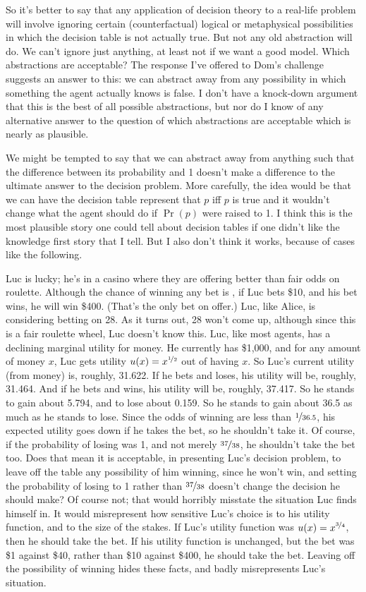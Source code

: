 \documentclass[11pt,oneside]{book}
\begin{document}
So it's better to say that any application of decision theory to a real-life problem will involve ignoring certain (counterfactual) logical or metaphysical possibilities in which the decision table is not actually true. But not any old abstraction will do. We can't ignore just anything, at least not if we want a good model. Which abstractions are acceptable? The response I've offered to Dom's challenge suggests an answer to this: we can abstract away from any possibility in which something the agent actually knows is false. I don't have a knock-down argument that this is the best of all possible abstractions, but nor do I know of any alternative answer to the question of which abstractions are acceptable which is nearly as plausible.

We might be tempted to say that we can abstract away from anything such that the difference between its probability and 1 doesn't make a difference to the ultimate answer to the decision problem. More carefully, the idea would be that we can have the decision table represent that $p$ iff $p$ is true and it wouldn't change what the agent should do if $\Pr(p)$ were raised to 1. I think this is the most plausible story one could tell about decision tables if one didn't like the knowledge first story that I tell. But I also don't think it works, because of cases like the following.

Luc is lucky; he's in a casino where they are offering better than fair odds on roulette. Although the chance of winning any bet is , if Luc bets \$10, and his bet wins, he will win \$400. (That's the only bet on offer.) Luc, like Alice, is considering betting on 28. As it turns out, 28 won't come up, although since this is a fair roulette wheel, Luc doesn't know this. Luc, like most agents, has a declining marginal utility for money. He currently has \$1,000, and for any amount of money $x$, Luc gets utility $u(x) = x^{\nicefrac{1}{2}}$ out of having $x$. So Luc's current utility (from money) is, roughly, 31.622. If he bets and loses, his utility will be, roughly, 31.464. And if he bets and wins, his utility will be, roughly, 37.417. So he stands to gain about 5.794, and to lose about 0.159. So he stands to gain about 36.5 as much as he stands to lose. Since the odds of winning are less than $\nicefrac{1}{36.5}$, his expected utility goes down if he takes the bet, so he shouldn't take it. Of course, if the probability of losing was 1, and not merely $\nicefrac{37}{38}$, he shouldn't take the bet too. Does that mean it is acceptable, in presenting Luc's decision problem, to leave off the table any possibility of him winning, since he won't win, and setting the probability of losing to 1 rather than $\nicefrac{37}{38}$ doesn't change the decision he should make? Of course not; that would horribly misstate the situation Luc finds himself in. It would misrepresent  how sensitive Luc's choice is to his utility function, and to the size of the stakes. If Luc's utility function was $u(x) = x^{\nicefrac{3}{4}}$, then he should take the bet. If his utility function is unchanged, but the bet was \$1 against \$40, rather than \$10 against \$400, he should take the bet. Leaving off the possibility of winning hides these facts, and badly misrepresents Luc's situation.
\end{document}
